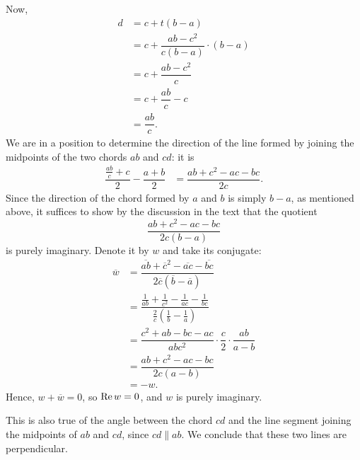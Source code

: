 \begin{exercise}
\begin{sol}
		Now,
		\begin{align*}
			d &=c+t(b-a) \\
			&=c+\dfrac{ab-c^2}{c(b-a)} \cdot (b-a) \\
			&=c+\dfrac{ab-c^2}{c} \\
			&=c+\dfrac{ab}{c}-c \\
			&=\dfrac{ab}{c}.
		\end{align*}
		We are in a position to determine the direction of the line formed by joining the midpoints of the two chords $ab$ and $cd$: it is
		\begin{align*}
			\dfrac{\frac{ab}{c}+c}{2}-\dfrac{a+b}{2} &=\dfrac{ab+c^2-ac-bc}{2c}.
		\end{align*}
		Since the direction of the chord formed by $a$ and $b$ is simply $b-a$, as mentioned above, it suffices to show by the discussion in the text that the quotient $$\dfrac{ab+c^2-ac-bc}{2c(b-a)}$$ is purely imaginary. Denote it by $w$ and take its conjugate:
		\begin{align*}
			\overline{w} &=\dfrac{\overline{ab}+\overline{c}^2-\overline{ac}-\overline{bc}}{2\overline{c}\left(\overline{b}-\overline{a}\right)} \\
			&=\dfrac{\frac{1}{ab}+\frac{1}{c^2}-\frac{1}{ac}-\frac{1}{bc}}{\frac{2}{c}\left(\frac{1}{b}-\frac{1}{a}\right)} \\
			&=\dfrac{c^2+ab-bc-ac}{abc^2} \cdot \dfrac{c}{2} \cdot \dfrac{ab}{a-b} \\
			&=\dfrac{ab+c^2-ac-bc}{2c(a-b)} \\
			&=-w.
		\end{align*}
		Hence, $w+\overline{w}=0$, so $\operatorname{Re} w=0$, and $w$ is purely imaginary.
		
		This is also true of the angle between the chord $cd$ and the line segment joining the midpoints of $ab$ and $cd$, since $cd \parallel ab$. We conclude that these two lines are perpendicular.
		

\end{sol}
\end{exercise}
